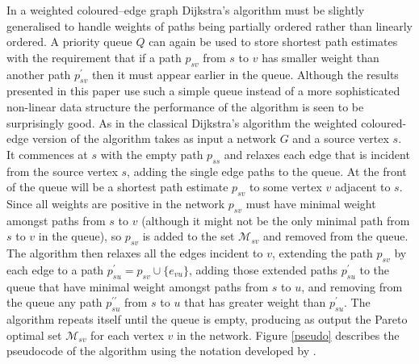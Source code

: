 \documentclass[preprint,authoryear,12pt]{elsarticle}
\begin{document}
In a weighted coloured--edge graph Dijkstra's algorithm must be slightly
generalised to handle weights of paths being partially ordered rather
than linearly ordered.
A priority queue $Q$ can again be used to store shortest path estimates
with the requirement that if a path $p_{sv}$ from $s$ to $v$ has smaller
weight than another path $p^\prime_{sv}$ then it must appear earlier in the queue.
Although the results presented in this paper use such a simple queue instead
of a more sophisticated non-linear data structure the performance
of the algorithm is seen to be surprisingly good.
As in the classical Dijkstra's algorithm the weighted coloured-edge version of
the algorithm takes as input a network $G$ and a source vertex $s$.
It commences at $s$ with the empty path $p_{ss}$ and relaxes each edge that is incident
from the source vertex $s$, adding the single edge paths to the queue.
At the front of the queue will be a shortest path estimate $p_{sv}$
to some vertex $v$ adjacent to $s$.
Since all weights are positive in the
network $p_{sv}$ must have minimal weight amongst paths from $s$ to $v$
(although it might not be the only minimal path from $s$ to $v$ in the queue),
so $p_{sv}$ is added to the set $\mathcal{M}_{sv}$ and removed from the queue.
The algorithm then relaxes all the edges incident to $v$,
extending the path $p_{sv}$ by each edge to a path $p^\prime_{su}=p_{sv}\cup\{e_{vu}\}$,
adding those extended paths $p^\prime_{su}$ to the queue that have minimal weight
amongst paths from $s$ to $u$, and removing from the queue any path $p^{\prime\prime}_{su}$
from $s$ to $u$ that has greater weight than $p^\prime_{su}$.
The algorithm repeats itself until the queue is empty, producing as output
the Pareto optimal set $\mathcal{M}_{sv}$ for each vertex $v$ in the network.
Figure \ref{pseudo} describes the pseudocode of the algorithm
using the notation developed by \cite{cormen01}.
\end{document}
